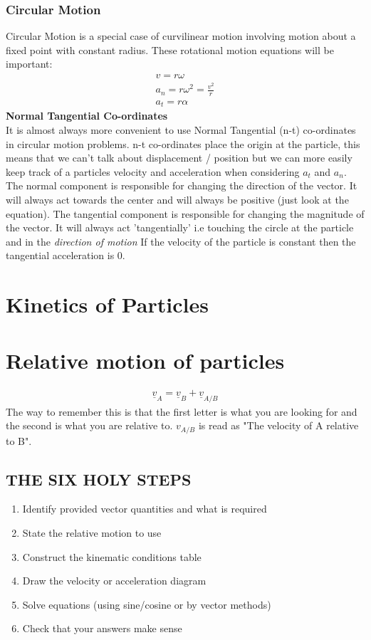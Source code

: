 \documentclass[a4paper, 12pt]{article}
\begin{document}
\subsubsection*{Circular Motion}
Circular Motion is a special case of curvilinear motion involving motion about a fixed point with constant radius. These rotational motion equations will be important:
\begin{align}
    v = r\omega \\
    a_n = r \omega^2 = \frac{v^2}{r} \\
    a_t = r\alpha 
\end{align}
\textbf{Normal Tangential Co-ordinates}
\\
\noindent
It is almost always more convenient to use Normal Tangential (n-t) co-ordinates in circular motion problems.
n-t co-ordinates place the origin at the particle, this means that we can't talk about displacement / position but
we can more easily keep track of a particles velocity and acceleration when considering $a_t$ and $a_n$.
\noindent
The normal component is responsible for changing the direction of the vector. 
It will always act towards the center and will always be positive (just look at the equation).
The tangential component is responsible for changing the magnitude of the vector. 
It will always act 'tangentially' i.e touching the circle at the particle and in the \textit{direction of motion}
If the velocity of the particle is constant then the tangential acceleration is 0.

\section*{Kinetics of Particles}

\section*{Relative motion of particles}
\begin{align*}
  \underline{v}_A = \underline{v}_B + \underline{v}_{A/B} 
\end{align*}
The way to remember this is that the first letter is what you are looking for and the second is what you are relative to. 
$v_{A/B}$ is read as "The velocity of A relative to B".
\subsection*{THE SIX HOLY STEPS}
\begin{enumerate}
  \item Identify provided vector quantities and what is required 
  \item State the relative motion to use 
  \item Construct the kinematic conditions table 
  \item Draw the velocity or acceleration diagram 
  \item Solve equations (using sine/cosine or by vector methods) 
  \item Check that your answers make sense
\end{enumerate}
\end{document}
